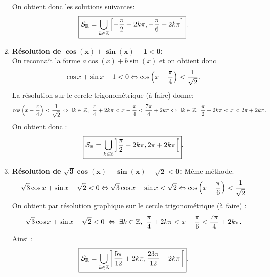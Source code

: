 \documentclass[a4paper, 11pt]{article}
\begin{document}
\begin{correction}
\begin{enumerate}
On obtient donc les solutions suivantes:
$$\fbox{$\mathcal{S}_{\mathbb{R}}=\displaystyle \mathop{\bigcup}\limits_{k\in \mathbb{Z}} \left[  -\displaystyle\frac{\pi}{2}+2k\pi, -\displaystyle\frac{\pi}{6}+2k\pi \right]$}.$$
\item \textbf{R\'esolution de $\mathbf{\cos{(x)}+\sin{(x)}-1<0   }$:}\\
\noindent On reconna\^{i}t la forme $a\cos{(x)}+b\sin{(x)}$ et on obtient donc
$$\cos{x}+\sin{x}-1<0 \Leftrightarrow \cos{\left( x-\displaystyle\frac{\pi}{4} \right)}<\displaystyle\frac{1}{\sqrt{2}}.$$
La r\'esolution sur le cercle trigonom\'etrique (\`a faire) donne: 
$$\cos{\left( x-\ddp\frac{\pi}{4} \right)}<\ddp\frac{1}{\sqrt{2}} \Leftrightarrow \exists k\in\Z,\ \ddp\frac{\pi}{4}+2k\pi <  x-\ddp\frac{\pi}{4} <\ddp\frac{7\pi}{4}+2k\pi \Leftrightarrow \exists k\in\Z,\ \ddp\frac{\pi}{2}+2k\pi <  x <2\pi+2k\pi .$$
On obtient donc :
$$\fbox{$\mathcal{S}_{\mathbb{R}}=\displaystyle \mathop{\bigcup}\limits_{k\in \mathbb{Z}} \left]  \displaystyle\frac{\pi}{2}+2k\pi , 2\pi+2k\pi\right[$}.$$
\item \textbf{R\'esolution de $\mathbf{ \sqrt{3}\cos{(x)}+\sin{(x)}-\sqrt{2}<0  }$:} M\^{e}me m\'ethode.
$$\sqrt{3}\cos{x}+\sin{x}-\sqrt{2}<0 \Leftrightarrow \sqrt{3}\cos{x}+\sin{x}<\sqrt{2} \Leftrightarrow \cos{\left( x-\displaystyle\frac{\pi}{6} \right)}<\displaystyle\frac{1}{\sqrt{2}} $$
On obtient par r\'esolution graphique sur le cercle trigonom\'etrique (\`a faire) :
$$\sqrt{3}\cos{x}+\sin{x}-\sqrt{2}<0 \; \Leftrightarrow  \; \exists k\in\mathbb{Z},\ \displaystyle\frac{\pi}{4}+2k\pi <  x-\displaystyle\frac{\pi}{6} <\displaystyle\frac{7\pi}{4}+2k\pi.$$ 
Ainsi :
$$\fbox{$\mathcal{S}_{\mathbb{R}}=\displaystyle \mathop{\bigcup}\limits_{k\in \mathbb{Z}} \left]    \displaystyle\frac{5\pi}{12}+2k\pi , \displaystyle\frac{23\pi}{12}+2k\pi\right[$}.$$
\end{enumerate}
\end{correction}



\vspace{0.5cm}


\end{document}
